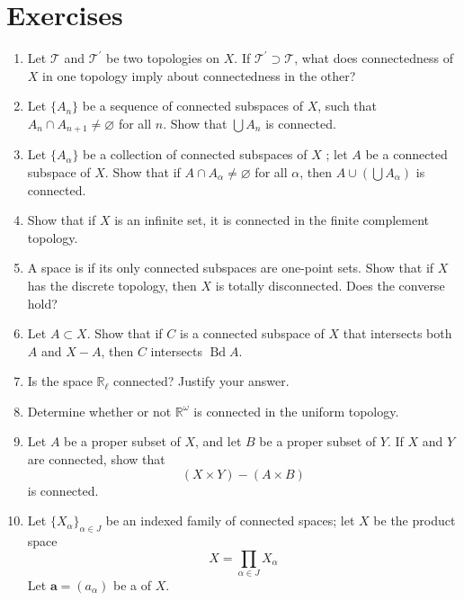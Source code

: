 \section*{Exercises}
\begin{enumerate}[itemsep=0.4em, parsep=0pt, topsep=0pt, partopsep=0pt, leftmargin=*, label=\arabic*., ref=\arabic*]
\item Let \(\mathcal{T}\) and \(\mathcal{T}^{\prime }\) be two topologies on \(X\). If \(\mathcal{T}^{\prime } \supset \mathcal{T}\), what does connectedness of \(X\) in one topology imply about connectedness in the other?
\item Let \(\{ A_{n}\}\) be a sequence of connected subspaces of \(X\), such that \(A_{n} \cap {A}_{n + 1} \neq \varnothing\) for all \(n\). Show that \(\bigcup {A}_{n}\) is connected.
\item Let \(\{ A_{\alpha }\}\) be a collection of connected subspaces of \(X\) ; let \(A\) be a connected subspace of \(X\). Show that if \(A \cap {A}_{\alpha } \neq \varnothing\) for all \(\alpha\), then \(A \cup ( {\bigcup {A}_{\alpha }})\) is connected.
\item Show that if \(X\) is an infinite set, it is connected in the finite complement topology.
\item A space is  if its only connected subspaces are one-point sets. Show that if \(X\) has the discrete topology, then \(X\) is totally disconnected. Does the converse hold?
\item Let \(A \subset X\). Show that if \(C\) is a connected subspace of \(X\) that intersects both \(A\) and \(X - A\), then \(C\) intersects \(\operatorname{Bd}A\).
\item Is the space \(\mathbb{R}_{\ell }\) connected? Justify your answer.
\item Determine whether or not \(\mathbb{R}^{\omega }\) is connected in the uniform topology.
\item Let \(A\) be a proper subset of \(X\), and let \(B\) be a proper subset of \(Y\). If \(X\) and \(Y\) are connected, show that \[ ( {X \times Y}) - ( {A \times B}) \] is connected.
\item Let \({\{ X_{\alpha }\} }_{\alpha \in J}\) be an indexed family of connected spaces; let \(X\) be the product space \[ X = \mathop{\prod }\limits_{{\alpha \in J}}X_{\alpha } \] Let \(\mathbf{a} = ( a_{\alpha })\) be a  of \(X\).
 \begin{enumerate}[itemsep=0.2em, parsep=0pt, topsep=0pt, partopsep=0pt, leftmargin=*, label=(\alph*), align=left]

\end{enumerate}
\end{enumerate}
